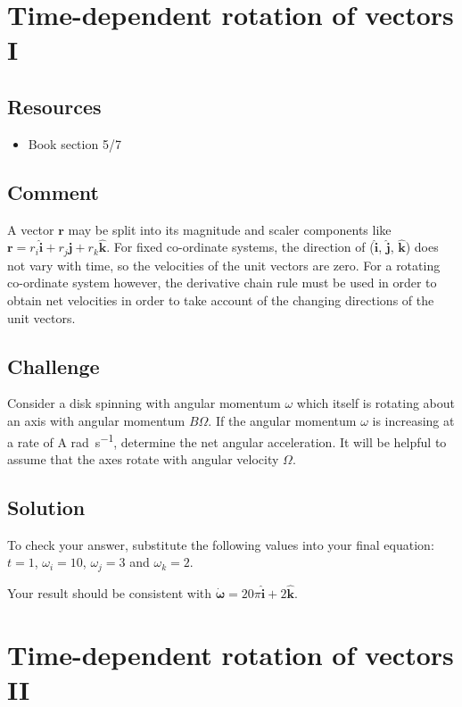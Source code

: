 \newpage
\section{Time-dependent rotation of vectors I}

\subsection*{Resources}
\begin{itemize}
    \item Book section 5/7
\end{itemize}

\subsection*{Comment}
A vector $\bm{r}$ may be split into its magnitude and scaler components like $\bm{r} = r_i \bm{\hat{i}} + r_j \bm{\hat{j}} + r_k \bm{\hat{k}}$. For fixed co-ordinate systems, the direction of ($\bm{\hat{i}}$, $\bm{\hat{j}}$, $\bm{\hat{k}}$) does not vary with time, so the velocities of the unit vectors are zero. For a rotating co-ordinate system however, the derivative chain rule must be used in order to obtain net velocities in order to take account of the changing directions of the unit vectors.

\subsection*{Challenge}
Consider a disk spinning with angular momentum $\omega$ which itself is rotating about an axis with angular momentum $B \Omega$.
If the angular momentum $\omega$ is increasing at a rate of A \si{\radian\per\second}, determine the net angular acceleration.
It will be helpful to assume that the axes rotate with angular velocity $\Omega$.


\subsection*{Solution}
To check your answer, substitute the following values into your final equation:
$t=1$,
$\omega_i=10$,
$\omega_j=3$ and
$\omega_k=2$.

Your result should be consistent with
$\bm{\dot{\omega}} = 20 \pi \bm{\hat{i}} + 2 \bm{\hat{k}}$.




\newpage
\section{Time-dependent rotation of vectors II}

